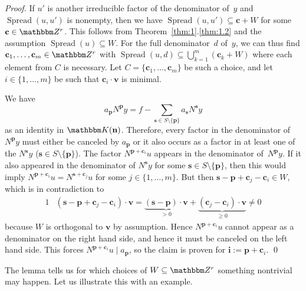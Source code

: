 \documentclass[a4paper]{sig-alternate}
\let\set\mathbbm
\def\vec#1{\mathbf{#1}}
\def\spread{\operatorname{Spread}}
\begin{document}
\begin{proof}
  If $u'$ is another irreducible factor of the denominator of~$y$ and
  $\spread(u,u')$ is nonempty, then we have $\spread(u,u')\subseteq\vec c+W$ for some $\vec c\in\set Z^r$.
  This follows from Theorem~\ref{thm:1}.\ref{thm:1.2} and the assumption $\spread(u)\subseteq W$.
  For the full denominator~$d$ of~$y$, we can thus find $\vec c_1,\dots,\vec c_m\in\set Z^r$
  with $\spread(u,d)\subseteq\bigcup_{k=1}^m(\vec c_k+W)$ where each element
  from $C$ is necessary.
  Let $C=\{\vec c_1,\dots,\vec c_m\}$ be such a choice, and let $i\in\{1,\dots,m\}$ be such that
  $\vec c_i\cdot\vec v$ is minimal.

  We have
  \[
    a_{\vec p}N^{\vec p}y=f-\sum_{\vec s\in S\setminus\{\vec p\}}a_{\vec s}N^{\vec s}y
  \]
  as an identity in $\set K(\vec n)$. Therefore, every factor in the denominator of $N^{\vec p}y$
  must either be canceled by $a_{\vec p}$ or it also occurs as a factor in at least
  one of the $N^{\vec s}y$ ($\vec s\in S\setminus\{\vec p\}$).
  The factor $N^{\vec p+\vec c_i}u$ appears in the denominator of~$N^{\vec p}y$.
  If it also appeared in the denominator of $N^{\vec s}y$ for some $\vec s\in S\setminus\{\vec p\}$,
  then this would imply $N^{\vec p+\vec c_i}u=N^{\vec s+\vec c_j}u$ for some $j\in\{1,\dots,m\}$.
  But then $\vec s-\vec p + \vec c_j-\vec c_i\in W$, which is in contradiction to
  \begin{alignat*}1
    &(\vec s-\vec p + \vec c_j-\vec c_i)\cdot\vec v
    =\underbrace{(\vec s-\vec p)\cdot\vec v}_{>0} + \underbrace{(\vec c_j-\vec c_i)\cdot\vec v}_{\geq0}
     \neq0
  \end{alignat*}
  because $W$ is orthogonal to $\vec v$ by assumption.
  Hence $N^{\vec p+\vec c_i}u$ cannot appear as a denominator on the right hand side,
  and hence it must be canceled on the left hand side.
  This forces $N^{\vec p+\vec c_i}u\mid a_{\vec p}$, so the claim is proven for
  $\vec i:=\vec p+\vec c_i$. \qed
\end{proof}

The lemma tells us for which choices of $W\subseteq\set Z^r$ something nontrivial may happen.
Let us illustrate this with an example.
\end{document}
